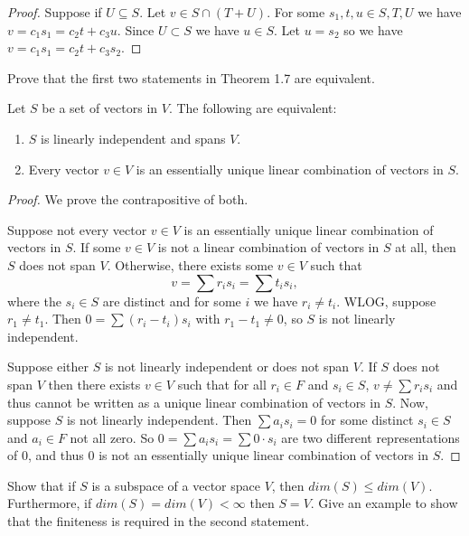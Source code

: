\begin{proof}
    Suppose if $U \subseteq S$.
    Let $v \in S \cap (T + U)$.
    For some $s_1, t, u \in S, T, U$ we have $v = c_1 s_1 = c_2 t + c_3 u$.
    Since $U \subset S$ we have $u \in S$.
    Let $u = s_2$ so we have $v = c_1 s_1 = c_2 t + c_3 s_2$.
\end{proof}

\begin{tcolorbox}[title=Problem 7, breakable]
    Prove that the first two statements in Theorem 1.7 are equivalent.
\end{tcolorbox}

\begin{theorem}
    Let $S$ be a set of vectors in $V$. The following are equivalent:
    \begin{enumerate}
        \item $S$ is linearly independent and spans $V$.
        \item Every vector $v \in V$ is an essentially unique linear combination of vectors in $S$.
    \end{enumerate}
\end{theorem}

\begin{proof}
    We prove the contrapositive of both.

    Suppose not every vector $v \in V$ is an essentially unique linear combination of vectors in $S$.
    If some $v \in V$ is not a linear combination of vectors in $S$ at all, then $S$ does not span $V$.
    Otherwise, there exists some $v \in V$ such that 
    \[v = \sum r_i s_i = \sum t_i s_i,\]
    where the $s_i \in S$ are distinct and for some $i$ we have $r_i \ne t_i$.
    WLOG, suppose $r_1 \ne t_1$.
    Then $0 = \sum (r_i - t_i) s_i$ with $r_1 - t_1 \ne 0$, so $S$ is not linearly independent.
    
    Suppose either $S$ is not linearly independent or does not span $V$.
    If $S$ does not span $V$ then there exists $v \in V$ such that for all $r_i \in F$ and $s_i \in S$,
        $v \ne \sum r_i s_i$ and thus cannot be written as a unique linear combination of vectors in $S$.
    Now, suppose $S$ is not linearly independent.
    Then $\sum a_i s_i = 0$ for some distinct $s_i \in S$ and $a_i \in F$ not all zero.
    So $0 = \sum a_i s_i = \sum 0 \cdot s_i$ are two different representations of $0$, and thus $0$ is not an essentially unique linear combination of vectors in $S$.
\end{proof}

\begin{tcolorbox}[title=Problem 11, breakable]
    Show that if $S$ is a subspace of a vector space $V$, then $dim(S) \le dim(V)$.
    Furthermore, if $dim(S) = dim(V) < \infty$ then $S = V$. Give an example to show that 
    the finiteness is required in the second statement.
\end{tcolorbox}

